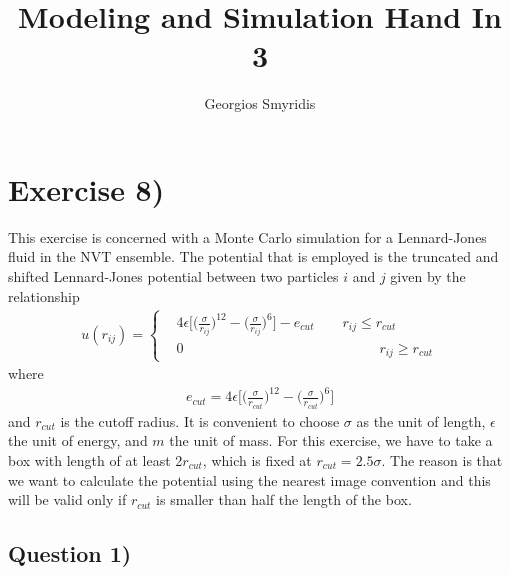 \documentclass[11pt]{report}
\title{Modeling and Simulation Hand In 3}
\author{Georgios Smyridis}
\begin{document}
\maketitle

\section*{Exercise 8)}

This exercise is concerned with a Monte Carlo simulation for a Lennard-Jones fluid in the NVT ensemble. The potential that is employed is the truncated and shifted Lennard-Jones potential between two particles $i$ and $j$ given by the relationship
\begin{align}
	u(r_{ij})=\left\{
	\begin{aligned}
		&4\epsilon \bigg[\bigg(\frac{\sigma}{r_{ij}}\bigg)^{12}-\bigg(\frac{\sigma}{r_{ij}}\bigg)^{6}\bigg] -e_{cut} \qquad r_{ij}\leq r_{cut} \\
		&0 \qquad\qquad\qquad\qquad\qquad\qquad\quad\quad r_{ij}\geq r_{cut}
	\end{aligned}
	\right.
\end{align}
where 
\begin{align}
	e_{cut} = 4\epsilon \bigg[\bigg(\frac{\sigma}{r_{cut}}\bigg)^{12}-\bigg(\frac{\sigma}{r_{cut}}\bigg)^{6}\bigg] 
\end{align}
and $r_{cut}$ is the cutoff radius. It is convenient to choose $\sigma$ as the unit of length, $\epsilon$ the unit of energy, and $m$ the unit of mass. For this exercise, we have to take a box with length of at least 2$r_{cut}$, which is fixed at $r_{cut}=2.5\sigma$. The reason is that we want to calculate the potential using the nearest image convention and this will be valid only if $r_{cut}$ is smaller than half the length of the box.

\subsection*{Question 1)}
\end{document}
